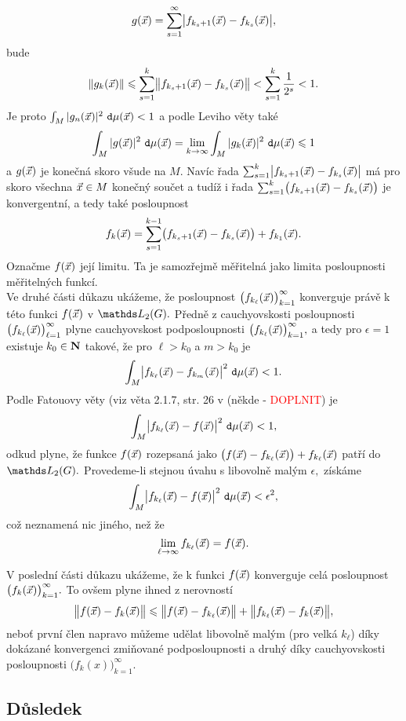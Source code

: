 $$g({\vec{x}})=\sum_{s=1}^\infty \bigl|f_{k_s+1}({\vec{x}})-f_{k_s}({\vec{x}})\bigr|,$$
%
bude
%
$$\|g_k({\vec{x}})\|\leqslant \sum_{s=1}^k
\bigl\|f_{k_s+1}({\vec{x}})-f_{k_s}({\vec{x}})\bigr\| < \sum_{s=1}^k
\frac{1}{2^s} <1.$$
%
Je proto $\int_M |g_n({\vec{x}})|^2~\mathtt{d}\mu({\vec{x}})<1$ a podle Leviho v\v ety
tak\'e
%
$$\int_M |g({\vec{x}})|^2~\mathtt{d}\mu({\vec{x}})=\lim_{k \rightarrow \infty} \int_M |g_k({\vec{x}})|^2~\mathtt{d}\mu({\vec{x}}) \leqslant
1$$
%
a $g({\vec{x}})$ je kone\v cn\'a skoro v\v sude na $M.$ Nav\'ic \v rada
$\sum_{s=1}^k \bigl|f_{k_s+1}({\vec{x}})-f_{k_s}({\vec{x}})\bigr|$ m\'a pro
skoro v\v sechna ${\vec{x}}\in M$ kone\v cn\'y sou\v cet  a tud\'i\v z i
\v rada $\sum_{s=1}^k \bigl(f_{k_s+1}({\vec{x}})-f_{k_s}({\vec{x}})\bigr)$ je
konvergentn\'i, a tedy tak\'e posloupnost
%
$$f_{k}({\vec{x}})=\sum_{s=1}^{k-1}
\bigl(f_{k_s+1}({\vec{x}})-f_{k_s}({\vec{x}})\bigr)+f_{k_1}({\vec{x}}).$$
%
Ozna\v cme $f({\vec{x}})$ jej\'i limitu. Ta je samoz\v rejm\v e m\v e\v
riteln\'a jako limita posloupnosti m\v e\v riteln\'ych funkc\'i.\\

Ve druh\'e \v c\'asti d\r ukazu uk\'a\v zeme, \v ze posloupnost
$\bigl(f_{k_\ell}({\vec{x}})\bigr)_{k=1}^\infty$  konverguje pr\'av\v e k
t\'eto funkci $f({\vec{x}})$ v $\LL_2(G).$ P\v redn\v e z cauchyovskosti
posloupnosti $\bigl(f_{k_\ell}({\vec{x}})\bigr)_{\ell=1}^\infty$  plyne
cauchyovskost podposloupnosti
$\bigl(f_{k_\ell}({\vec{x}})\bigr)_{k=1}^\infty,$ a tedy pro $\epsilon=1$
existuje $k_0\in{\mathbf N}$ takov\'e, \v ze pro $\ell>k_0$ a $m>k_0$ je
%
$$\int_M \bigl|f_{k_\ell}({\vec{x}})-f_{k_m}({\vec{x}})\bigr|^2~\mathtt{d}\mu({\vec{x}})<1.$$
%
Podle Fatouovy v\v ety (viz v\v eta 2.1.7, str. 26 v (někde - \textcolor{red}{DOPLNIT}) je
%
$$\int_M \bigl|f_{k_\ell}({\vec{x}})-f({\vec{x}})\bigr|^2~\mathtt{d}\mu({\vec{x}})<1,$$
%
odkud plyne, \v ze funkce $f({\vec{x}})$ rozepsan\'a jako
$\bigl(f({\vec{x}})-f_{k_\ell}({\vec{x}})\bigr)+f_{k_\ell}({\vec{x}})$ pat\v r\'i do
$\LL_2(G).$ Provedeme-li stejnou \'uvahu s libovoln\v e mal\'ym
$\epsilon,$ z\'isk\'ame
%
$$\int_M \bigl|f_{k_\ell}({\vec{x}})-f({\vec{x}})\bigr|^2~\mathtt{d}\mu({\vec{x}})<\epsilon^2,$$
%
co\v z neznamen\'a nic jin\'eho, ne\v z \v ze
%
$$\lim_{\ell \rightarrow \infty} f_{k_\ell}({\vec{x}})=f({\vec{x}}).$$

V posledn\'i \v c\'asti d\r ukazu uk\'a\v zeme, \v ze k funkci
$f({\vec{x}})$ konverguje cel\'a posloupnost
$\bigl(f_k({\vec{x}})\bigr)_{k=1}^\infty.$ To ov\v sem plyne ihned z
nerovnost\'i
%
$$\bigl\|f({\vec{x}})-f_k({\vec{x}})\bigr\| \leqslant
\bigl\|f({\vec{x}})-f_{k_\ell}({\vec{x}})\bigr\| +
\bigl\|f_{k_\ell}({\vec{x}})-f_k({\vec{x}})\bigr\|,$$
%
nebo\v t prvn\'i \v clen napravo m\r u\v zeme ud\v elat libovoln\v
e mal\'ym (pro velk\'a $k_\ell$) d\'iky dok\'azan\'e konvergenci
zmi\v novan\'e podposloupnosti a druh\'y d\'iky cauchyovskosti
posloupnosti $\bigl(f_k(x)\bigr)_{k=1}^\infty.$

\subsection{D\r usledek}

